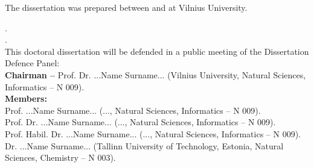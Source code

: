 \begin{singlespace}
\noindent\nohyphens{The dissertation was prepared between {\thesisPreparationStartYear} and {\thesisYear} at Vilnius University.}

\vspace{1cm}

.\\
.\\ %

\vspace{2cm}
\noindent
This doctoral dissertation will be defended in a public meeting of the Dissertation Defence Panel:\\
{\bf Chairman  --} {{Prof. Dr. ...Name Surname...} (Vilnius University, Natural Sciences, Informatics -- N 009)}.\\ %
{\bf Members:}\\ %
{Prof. ...Name Surname...}
(..., Natural Sciences, Informatics -- N 009).\\%
{Prof. Dr. ...Name Surname...}
(..., Natural Sciences, Informatics -- N 009).\\
{Prof. Habil. Dr. ...Name Surname...} 
(..., Natural Sciences, Informatics -- N 009).\\
{Dr. ...Name Surname...}
(Tallinn University of Technology, Estonia, Natural Sciences, Chemistry -- N 003).\\


\end{singlespace}
